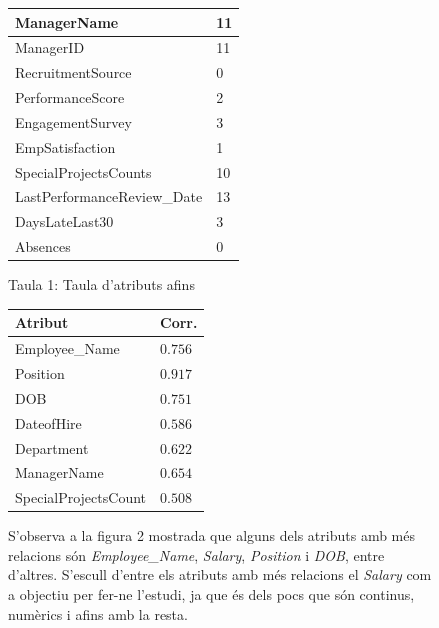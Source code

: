 \documentclass[a4paper, 11pt]{article}
\begin{document}
\begin{figure}[h]
\begin{minipage}{8cm}
\begin{center}
\begin{tabular}{l|l}
        ManagerName & 11 \\\hline
        ManagerID & 11 \\\hline
        RecruitmentSource & 0 \\\hline
        PerformanceScore & 2 \\\hline
        EngagementSurvey & 3 \\\hline
        EmpSatisfaction & 1 \\\hline
        SpecialProjectsCounts & 10 \\\hline
        LastPerformanceReview\_Date & 13 \\\hline
        DaysLateLast30 & 3\\\hline
        Absences & 0\\
    \end{tabular}
    Taula 1: Taula d'atributs afins
    \setcounter{table}{1}
    \label{tab:afins}
\end{center}
\end{minipage} %
\hspace{2em}
\begin{minipage}{6.3cm} %
\begin{center}
   \begin{tabular}{l|l}
        \textbf{Atribut} & \textbf{Corr.}\\\hline\hline
        Employee\_Name & $0.756$ \\\hline
        Position &  $0.917$ \\\hline
        DOB & $0.751$ \\\hline
        DateofHire & $0.586$ \\\hline
        Department & $0.622$ \\\hline
        ManagerName & $0.654$  \\\hline
        SpecialProjectsCount & $0.508$  \\
\end{tabular}
\end{center}
S'observa a la figura 2 mostrada
que alguns dels atributs amb més
relacions són \textit{Employee\_Name},
\textit{Salary}, \textit{Position} i \textit{DOB}, entre
d'altres. S'escull d'entre els
atributs amb més relacions el
\textit{Salary} com a objectiu per fer-ne
l'estudi, ja que és dels pocs que són
continus, numèrics i afins amb
la resta.\\\\

\end{minipage}
\end{figure}
\end{document}
